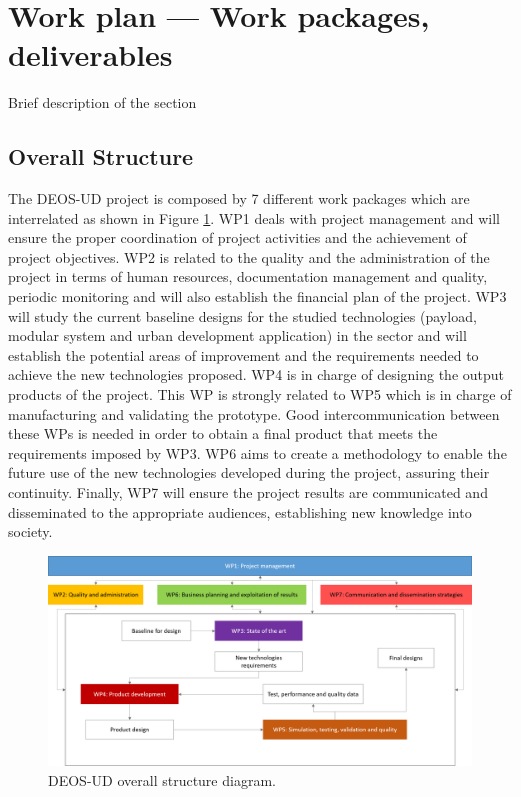 \section{Work plan — Work packages, deliverables}

Brief description of the section

\subsection{Overall Structure}

The DEOS-UD project is composed by 7 different work packages which are interrelated as shown in Figure \ref{overallstructure}. WP1 deals with project management and will ensure the proper coordination of project activities and the achievement of project objectives. WP2 is related to the quality and the administration of the project in terms of human resources, documentation management and quality, periodic monitoring and will also establish the financial plan of the project. WP3 will study the current baseline designs for the studied technologies (payload, modular system and urban development application) in the sector and will establish the potential areas of improvement and the requirements needed to achieve the new technologies proposed. WP4 is in charge of designing the output products of the project. This WP is strongly related to WP5 which is in charge of manufacturing and validating the prototype. Good intercommunication between these WPs is needed in order to obtain a final product that meets the requirements imposed by WP3. WP6 aims to create a methodology to enable the future use of the new technologies developed during the project, assuring their continuity. Finally, WP7 will ensure the project results are communicated and disseminated to the appropriate audiences, establishing new knowledge into society. 

\begin{figure}[H]
\centering
\includegraphics[width=\textwidth]{images/overallstructure.png}
\caption{DEOS-UD overall structure diagram.} 
\label{overallstructure}
\end{figure}

